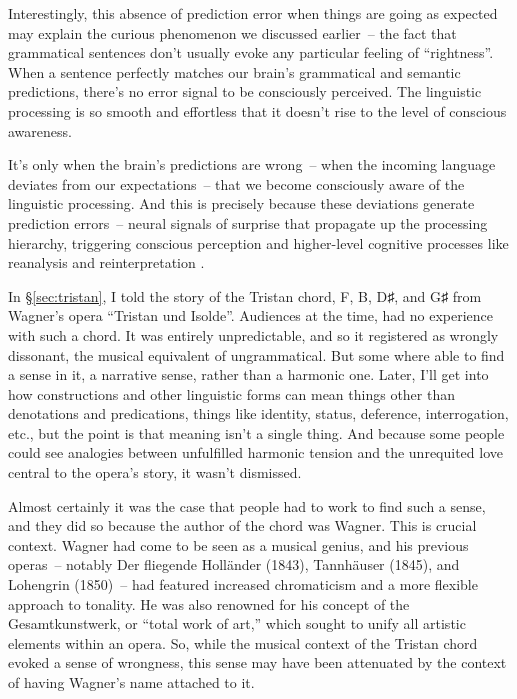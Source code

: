 Interestingly, this absence of prediction error when things are going as expected may explain the curious phenomenon we discussed earlier~-- the fact that grammatical sentences don't usually evoke any particular feeling of ``rightness''. When a sentence perfectly matches our brain's grammatical and semantic predictions, there's no error signal to be consciously perceived. The linguistic processing is so smooth and effortless that it doesn't rise to the level of conscious awareness.

It's only when the brain's predictions are wrong~-- when the incoming language deviates from our expectations~-- that we become consciously aware of the linguistic processing. And this is precisely because these deviations generate prediction errors~-- neural signals of surprise that propagate up the processing hierarchy, triggering conscious perception and higher-level cognitive processes like reanalysis and reinterpretation \citep{Rabovsky2018}.

\bigskip

In \S\ref{sec:tristan}, I told the story of the Tristan chord, F, B, D♯, and G♯ from Wagner's opera ``Tristan und Isolde''. Audiences at the time, had no experience with such a chord. It was entirely unpredictable, and so it registered as wrongly dissonant, the musical equivalent of ungrammatical. But some where able to find a sense in it, a narrative sense, rather than a harmonic one. Later, I'll get into how constructions and other linguistic forms can mean things other than denotations and predications, things like identity, status, deference, interrogation, etc., but the point is that meaning isn't a single thing. And because some people could see analogies between unfulfilled harmonic tension and the unrequited love central to the opera's story, it wasn't dismissed.

Almost certainly it was the case that people had to work to find such a sense, and they did so because the author of the chord was Wagner. This is crucial context. Wagner had come to be seen as a musical genius, and his previous operas~-- notably Der fliegende Holländer (1843), Tannhäuser (1845), and Lohengrin (1850)~-- had featured increased chromaticism and a more flexible approach to tonality. He was also renowned for his concept of the Gesamtkunstwerk, or ``total work of art,'' which sought to unify all artistic elements within an opera. So, while the musical context of the Tristan chord evoked a sense of wrongness, this sense may have been attenuated by the context of having Wagner's name attached to it.

